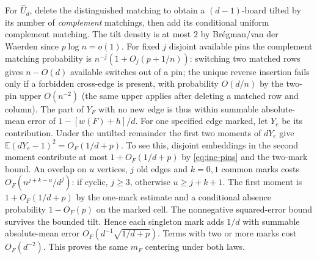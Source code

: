 For $\widehat U_d$, delete the distinguished matching to obtain a $(d-1)$-board
tilted by its number of \emph{complement} matchings, then add its
conditional uniform complement matching. The tilt density is at most
$2$ by Br\'egman/van der Waerden since $p\log n=o(1)$.
For fixed $j$ disjoint available pins the complement matching probability
is $n^{-j}(1+O_j(p+1/n))$: switching two matched rows gives $n-O(d)$
available switches out of a pin; the unique reverse insertion fails
only if a forbidden cross-edge is present, with probability $O(d/n)$
by the two-pin upper $O(n^{-2})$ (the same upper applies after deleting
a matched row and column). The part of $Y_F$ with no new edge is thus
within summable absolute-mean error of $1-[w(F)+h]/d$.
For one specified edge marked, let $Y_e$ be its contribution. Under
the untilted remainder the first two moments of $dY_e$ give
$\mathbb E(dY_e-1)^2=O_F(1/d+p)$. To see this, disjoint embeddings in
the second moment contribute at most $1+O_F(1/d+p)$ by \eqref{eq:inc-pins} and the
two-mark bound. An overlap on $u$ vertices, $j$ old edges and $k=0,1$
common marks costs $O_F(n^{j+k-u}/d^j)$: if cyclic, $j\ge3$, otherwise
$u\ge j+k+1$. The first moment is $1+O_F(1/d+p)$ by the one-mark
estimate and a conditional absence probability $1-O_F(p)$ on the marked
cell. The nonnegative squared-error bound survives the bounded tilt.
Hence each singleton mark adds $1/d$ with summable absolute-mean error
$O_F(d^{-1}\sqrt{1/d+p})$. Terms with two or more marks cost
$O_F(d^{-2})$. This proves the same $m_F$ centering under both laws.

